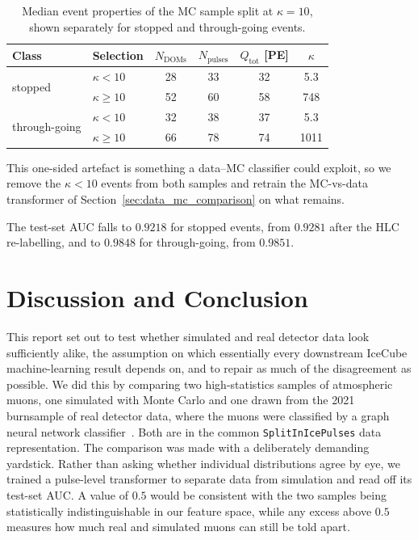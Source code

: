 \begin{table}[H]
\centering
\small
\begin{tabular}{llcccc}
\toprule
Class & Selection & $N_{\mathrm{DOMs}}$ & $N_{\mathrm{pulses}}$ & $Q_{\mathrm{tot}}$ [PE] & $\kappa$ \\
\midrule
\multirow{2}{*}{stopped} & $\kappa < 10$ & 28 & 33 & 32 & 5.3 \\
                         & $\kappa \geq 10$    & 52 & 60 & 58 & 748 \\
\midrule
\multirow{2}{*}{through-going} & $\kappa < 10$ & 32 & 38 & 37 & 5.3 \\
                               & $\kappa \geq 10$    & 66 & 78 & 74 & 1011 \\
\bottomrule
\end{tabular}
\caption{Median event properties of the MC sample split at $\kappa=10$, shown
separately for stopped and through-going events.}
\label{tab:kappa_split}
\end{table}

This one-sided artefact is something a data--MC classifier could exploit, so we
remove the $\kappa<10$ events from both samples and retrain the MC-vs-data
transformer of Section~\ref{sec:data_mc_comparison} on what remains.

The test-set AUC falls to $0.9218$ for stopped events, from $0.9281$ after the
HLC re-labelling, and to $0.9848$ for through-going, from $0.9851$.


\chapter{Discussion and Conclusion}

This report set out to test whether simulated and real detector data look
sufficiently alike, the assumption on which essentially every downstream IceCube
machine-learning result depends on, and to repair as much of the disagreement as
possible. We did this by comparing two high-statistics samples of atmospheric muons, one
simulated with Monte Carlo and one drawn from the 2021 burnsample of real
detector data, where the muons were classified by a graph neural network
classifier~\cite{DenBestenPrivate}. Both are in the common
\texttt{SplitInIcePulses} data representation. The comparison was made with a
deliberately demanding yardstick. Rather than asking whether individual
distributions agree by eye, we trained a pulse-level transformer to separate
data from simulation and read off its test-set AUC. A value of $0.5$ would be consistent
with the two samples being statistically indistinguishable in our feature space, while
any excess above $0.5$ measures how much real and simulated muons can still be
told apart.

